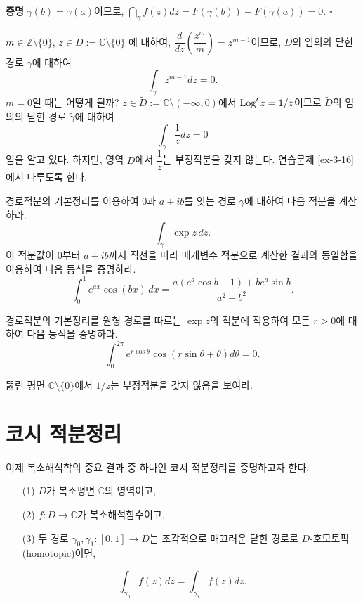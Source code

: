 {\bf 증명}
$\gamma(b)=\gamma(a)$이므로,
$\dint_\gamma f(z)dz = F(\gamma(b)) - F(\gamma(a)) = 0$.
\hfill $\square$

\begin{saltexample}[label=example-3-7]{}{}
$m\in\mathbb Z\setminus \{0\}$, $z\in D:=\mathbb C \setminus\{0\}$
에 대하여, 
$\dfrac d{dz}\left( \dfrac{z^m}m\right) = z^{m-1}$이므로,
$D$의 임의의 닫힌 경로 $\gamma$에 대하여
\[
\int_\gamma z^{m-1}dz = 0.
\]
$m=0$일 때는 어떻게 될까?
$z\in\tilde D:= \mathbb C \setminus (-\infty,0)$에서
$\mathop{\mathrm{Log}}' z = 1/z$이므로 $\tilde D$의 임의의 닫힌 경로 $\tilde \gamma$에 대하여
\[
\int_{\tilde\gamma} \frac1z dz = 0
\]
임을 알고 있다. 하지만, 영역 $D$에서 $\dfrac 1z$는 부정적분을 갖지 않는다.
연습문제 \ref{ex-3-16}에서 다루도록 한다.
\end{saltexample}

\begin{salt_exercise} \label{ex-3-14}
경로적분의 기본정리를 이용하여 
$0$과 $a+ib$를 잇는 경로 $\gamma$에 대하여
다음 적분을 계산하라.
\[
\int_\gamma \exp z \, dz.
\]
이 적분값이
$0$부터 $a+ib$까지 직선을 따라 매개변수 적분으로 계산한 결과와 동일함을 이용하여
다음 등식을 증명하라.
\[
\int_0^1 e^{ax}\cos(bx)\, dx = \dfrac{a(e^a\cos b - 1) + be^a\sin b}{a^2+b^2}.
\]
\end{salt_exercise}

\begin{salt_exercise} \label{ex-3-15}
경로적분의 기본정리를 원형 경로를 따르는 $\exp z$의 적분에  적용하여
모든 $r>0$에 대하여 다음 등식을 증명하라.
\[
\int_0^{2\pi} e^{r\cos\theta} \cos(r\sin\theta+\theta)d\theta = 0.
\]
\end{salt_exercise}

\begin{salt_exercise} \label{ex-3-16}
뚫린 평면 $\mathbb C\setminus \{0\}$에서 $1/z$는 부정적분을 갖지 않음을 보여라.
\end{salt_exercise}

\section{코시 적분정리}

이제 복소해석학의 중요 결과 중 하나인 코시 적분정리를 증명하고자 한다.

\begin{salttheorem} [코시 적분정리] {}{} \label{thm-3-4}

\begin{itemize}
\item[(1)] $D$가 복소평면 $\mathbb C$의 영역이고,
\item[(2)] $f:D\to\mathbb C$가 복소해석함수이고,
\item[(3)] 두 경로 $\gamma_0, \gamma_1 :[0,1]\to D$는  조각적으로 매끄러운 닫힌 경로로
$D$-호모토픽(homotopic)이면,
\end{itemize}
\[
\int_{\gamma_0} f(z)dz = \int_{\gamma_1} f(z)dz.
\]
\end{salttheorem}

